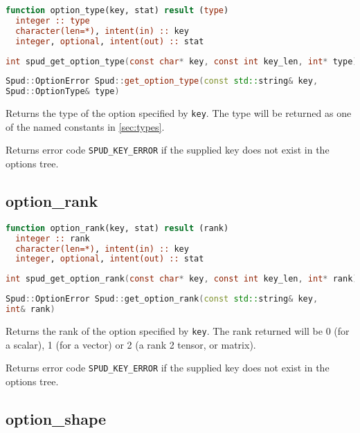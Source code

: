\documentclass[a4paper, 11pt]{book}
\begin{document}
\begin{lstlisting}[language=fortran]
function option_type(key, stat) result (type)
  integer :: type
  character(len=*), intent(in) :: key
  integer, optional, intent(out) :: stat
\end{lstlisting}

\begin{lstlisting}[language=C]
int spud_get_option_type(const char* key, const int key_len, int* type)
\end{lstlisting}

\begin{lstlisting}[language=C++]
Spud::OptionError Spud::get_option_type(const std::string& key,
Spud::OptionType& type)
\end{lstlisting}

Returns the type of the option specified by \lstinline+key+. The type will
be returned as one of the named constants in \ref{sec:types}.

Returns error code \lstinline+SPUD_KEY_ERROR+ if the supplied key does not
exist in the options tree.

\subsection{option\_rank}

\begin{lstlisting}[language=fortran]
function option_rank(key, stat) result (rank)
  integer :: rank
  character(len=*), intent(in) :: key
  integer, optional, intent(out) :: stat
\end{lstlisting}

\begin{lstlisting}[language=C]
int spud_get_option_rank(const char* key, const int key_len, int* rank)
\end{lstlisting}

\begin{lstlisting}[language=C++]
Spud::OptionError Spud::get_option_rank(const std::string& key,
int& rank)
\end{lstlisting}

Returns the rank of the option specified by \lstinline+key+. The rank returned
will be 0 (for a scalar), 1 (for a vector) or 2 (a rank 2 tensor, or matrix).

Returns error code \lstinline+SPUD_KEY_ERROR+ if the supplied key does not
exist in the options tree.

\subsection{option\_shape}
\end{document}

